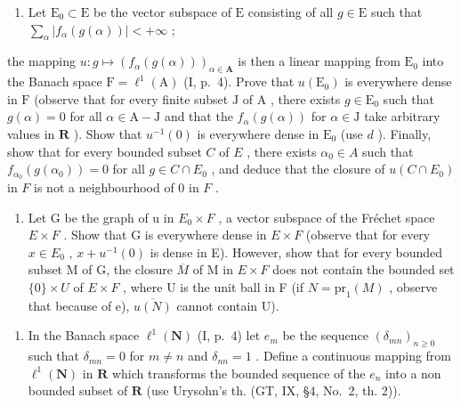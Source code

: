 \begin{enumerate}
\def\labelenumi{\alph{enumi})}
\setcounter{enumi}{4}
\tightlist
\item
  Let \(\mathrm{E}_0 \subset \mathrm{E}\) be the vector subspace of \(\mathrm{E}\) consisting of all \(g \in \mathrm{E}\) such that \(\sum_{\alpha} |f_{\alpha}(g(\alpha))| < +\infty\) ;
\end{enumerate}

the mapping \(u: g \mapsto (f_{\alpha}(g(\alpha)))_{\alpha \in \mathbf{A}}\) is then a linear mapping from \(\mathrm{E}_0\) into the Banach space \(\mathrm{F} = \ell^1(\mathrm{A})\) (I, p.~4). Prove that \(u(\mathrm{E}_0)\) is everywhere dense in \(\mathrm{F}\) (observe that for every finite subset \(\mathrm{J}\) of \(\mathrm{A}\) , there exists \(g \in \mathrm{E}_0\) such that \(g(\alpha) = 0\) for all \(\alpha \in \mathrm{A} - \mathrm{J}\) and that the \(f_{\alpha}(g(\alpha))\) for \(\alpha \in \mathrm{J}\) take arbitrary values in \(\mathbf{R}\) ). Show that \(u^{-1}(0)\) is everywhere dense in \(\mathrm{E}_0\) (use \(d\) ). Finally, show that for every bounded subset \(C\) of \(E\) , there exists \(\alpha_0 \in A\) such that \(f_{\alpha_0}(g(\alpha_0)) = 0\) for all \(g \in C \cap E_0\) , and deduce that the closure of \(u(C \cap E_0)\) in \(F\) is not a neighbourhood of 0 in \(F\) .

\begin{enumerate}
\def\labelenumi{\alph{enumi})}
\setcounter{enumi}{5}
\tightlist
\item
  Let G be the graph of u in \(E_{0} \times F\) , a vector subspace of the Fréchet space \(E \times F\) . Show that G is everywhere dense in \(E \times F\) (observe that for every \(x \in E_{0}\) , \(x + u^{-1}(0)\) is dense in E). However, show that for every bounded subset M of G, the closure \(\overline{M}\) of M in \(E \times F\) does not contain the bounded set \(\{0\} \times U\) of \(E \times F\) , where U is the unit ball in F (if \(N = \text{pr}_{1}(M)\) , observe that because of e), \(\overline{u(N)}\) cannot contain U).
\end{enumerate}

\begin{enumerate}
\def\labelenumi{\arabic{enumi})}
\setcounter{enumi}{17}
\tightlist
\item
  In the Banach space \(\ell^1 (\mathbf{N})\) (I, p.~4) let \(e_m\) be the sequence \((\delta_{mn})_{n\geq 0}\) such that \(\delta_{mn} = 0\) for \(m\neq n\) and \(\delta_{nn} = 1\) . Define a continuous mapping from \(\ell^1 (\mathbf{N})\) in \(\mathbf{R}\) which transforms the bounded sequence of the \(e_n\) into a non bounded subset of \(\mathbf{R}\) (use Urysohn's th. (GT, IX, §4, No.~2, th. 2)).
\end{enumerate}

